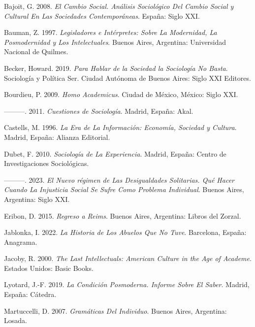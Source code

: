 \documentclass[
]{interact}
\newlength{\cslhangindent}
\newenvironment{CSLReferences}[2] %
 {\begin{list}{}{%
  \setlength{\itemindent}{0pt}
  \setlength{\leftmargin}{0pt}
  \setlength{\parsep}{0pt}
  \ifodd #1
   \setlength{\leftmargin}{\cslhangindent}
   \setlength{\itemindent}{-1\cslhangindent}
  \fi
  \setlength{\itemsep}{#2\baselineskip}}}
 {\end{list}}
\begin{document}
\label{refs}
\begin{CSLReferences}{1}{0}
Bajoit, G. 2008. \emph{El Cambio Social. {An{á}lisis} Sociol{ó}gico Del
Cambio Social y Cultural En Las Sociedades Contempor{á}neas}. Espa{ñ}a:
Siglo XXI.

Bauman, Z. 1997. \emph{Legisladores e Int{é}rpretes: {Sobre} La
Modernidad, La Posmodernidad y Los Intelectuales}. Buenos Aires,
Argentina: Universidad Nacional de Quilmes.

Becker, Howard. 2019. \emph{{Para Hablar de la Sociedad la Sociolog{í}a
No Basta}}. {Sociolog{í}a y Pol{í}tica Ser}. Ciudad Aut{ó}noma de Buenos
Aires: Siglo XXI Editores.

Bourdieu, P. 2009. \emph{Homo Academicus}. Ciudad de M{é}xico, M{é}xico:
Siglo XXI.

---------. 2011. \emph{Cuestiones de Sociolog{í}a}. Madrid, Espa{ñ}a:
Akal.

Castells, M. 1996. \emph{La Era de La Informaci{ó}n: {Econom{í}a},
Sociedad y Cultura}. Madrid, Espa{ñ}a: Alianza Editorial.

Dubet, F. 2010. \emph{Sociolog{í}a de La Experiencia}. Madrid, Espa{ñ}a:
Centro de Investigaciones Sociol{ó}gicas.

---------. 2023. \emph{El Nuevo r{é}gimen de Las Desigualdades
Solitarias. {Qu{é}} Hacer Cuando La Injusticia Social Se Sufre Como
Problema Individual}. Buenos Aires, Argentina: Siglo XXI.

Eribon, D. 2015. \emph{Regreso a Reims}. Buenos Aires, Argentina: Libros
del Zorzal.

Jablonka, I. 2022. \emph{La Historia de Los Abuelos Que No Tuve}.
Barcelona, Espa{ñ}a: Anagrama.

Jacoby, R. 2000. \emph{The Last Intellectuals: {American} Culture in the
Age of Academe}. Estados Unidos: Basic Books.

Lyotard, J.-F. 2019. \emph{La Condici{ó}n Posmoderna. {Informe} Sobre El
Saber}. Madrid, Espa{ñ}a: C{á}tedra.

Martuccelli, D. 2007. \emph{Gram{á}ticas Del Individuo}. Buenos Aires,
Argentina: Losada.


\end{CSLReferences}
\end{document}
